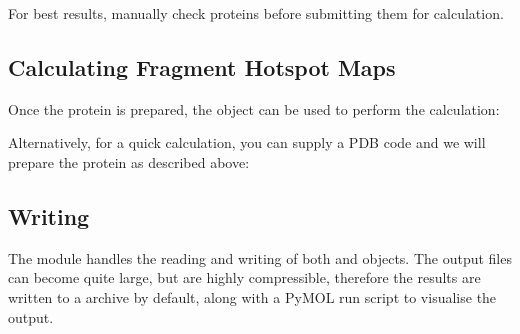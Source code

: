 \documentclass[letterpaper,10pt,english]{sphinxmanual}
\begin{document}
For best results, manually check proteins before submitting them for calculation.


\subsection{Calculating Fragment Hotspot Maps}
\label{\detokenize{tutorial:calculating-fragment-hotspot-maps}}
Once the protein is prepared, the {\hyperref[\detokenize{calculation_api:hotspots.calculation.Runner}]{}} object can be used to perform the calculation:

\begin{sphinxVerbatim}[commandchars=\\\{\}]
   

  
  
\end{sphinxVerbatim}

Alternatively, for a quick calculation, you can supply a PDB code and we will prepare the protein as described above:

\begin{sphinxVerbatim}[commandchars=\\\{\}]
  
  
\end{sphinxVerbatim}


\subsection{Writing}
\label{\detokenize{tutorial:writing}}
The {\hyperref[\detokenize{hs_io_api:module-hotspots.hs_io}]{}} module handles the reading and writing of both 
and  objects. The output  files can become quite large, but are highly
compressible, therefore the results are written to a  archive by default, along with a PyMOL run script to
visualise the output.
\end{document}
